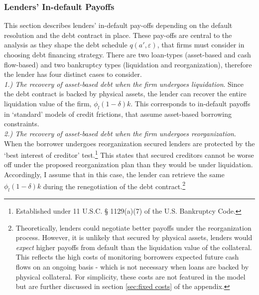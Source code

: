 \documentclass[12pt]{article}
\begin{document}
\subsubsection{Lenders' In-default Payoffs}   \label{sec:Default Payoffs}
This section describes lenders' in-default pay-offs depending on the default resolution and the debt contract in place. These pay-offs are central to the analysis as they shape the debt schedule $q(a', \varepsilon)$, that firms must consider in choosing debt financing strategy. There are two loan-types (asset-based and cash flow-based) and two bankruptcy types (liquidation and reorganization), therefore the lender has four distinct cases to consider. \vspace{3mm} \\
\textit{ 1.) The recovery of asset-based debt when the firm undergoes liquidation}. Since the debt contract is backed by physical assets, the lender can recover the entire liquidation value of the firm, $\phi_l(1-\delta)k$. This corresponds to in-default payoffs in `standard' models of credit frictions, that assume asset-based borrowing constraints. \vspace{3mm} \\
\textit{ 2.) The recovery of asset-based debt when the firm undergoes reorganization}. When the borrower undergoes reorganization secured lenders are protected by the ‘best interest of creditor’ test.\footnote{Established under 11 U.S.C. § 1129(a)(7) of the U.S. Bankruptcy Code.} This states that secured creditors cannot be worse off under the proposed reorganization plan than they would be under liquidation. Accordingly, I assume that in this case, the lender can retrieve the same $\phi_l(1-\delta)k$ during the renegotiation of the debt contract.\footnote{Theoretically, lenders could negotiate better payoffs under the reorganization process. However, it is unlikely that secured by physical assets, lenders would \textit{expect} higher payoffs from default than the liquidation value of the collateral. This reflects the high costs of monitoring borrowers expected future cash flows on an ongoing basis - which is not necessary when loans are backed by physical collateral. For simplicity, these costs are not featured in the model but are further discussed in section \ref{sec:fixed costs} of the appendix.} \vspace{3mm} \\
\end{document}
